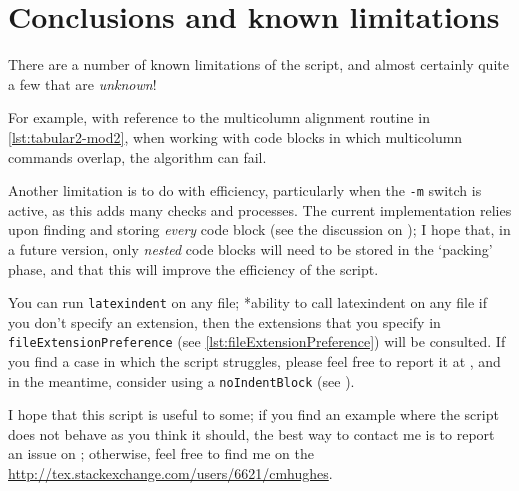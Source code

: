 \section{Conclusions and known limitations}\label{sec:knownlimitations}
 There are a number of known limitations of the script, and almost certainly quite a few
 that are \emph{unknown}!

 For example, with reference to the multicolumn alignment routine in
 \vref{lst:tabular2-mod2}, when working with code blocks in which multicolumn commands
 overlap, the algorithm can fail.

 Another limitation is to do with efficiency, particularly when the \texttt{-m} switch is
 active, as this adds many checks and processes. The current implementation relies upon
 finding and storing \emph{every} code block (see the discussion on
 ); I hope that, in a future version, only \emph{nested} code blocks
 will need to be stored in the `packing' phase, and that this will improve the efficiency
 of the script.

 You can run \texttt{latexindent} on any file;%
 *{ability to call latexindent on any file} if you don't specify an
 extension, then the extensions that you specify in
 \lstinline[breaklines=true]!fileExtensionPreference! (see
 \vref{lst:fileExtensionPreference}) will be consulted. If you find a case in which the
 script struggles, please feel free to report it at \cite{latexindent-home}, and in the
 meantime, consider using a \texttt{noIndentBlock} (see ).

 I hope that this script is useful to some; if you find an example where the script does
 not behave as you think it should, the best way to contact me is to report an issue on
 \cite{latexindent-home}; otherwise, feel free to find me on the
 \url{http://tex.stackexchange.com/users/6621/cmhughes}.
